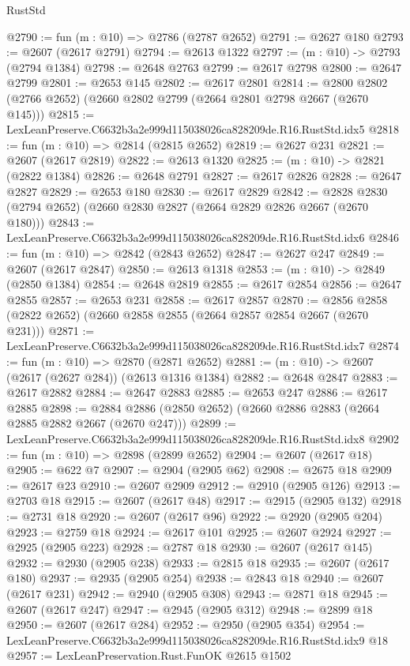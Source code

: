 \begin{lexlean}{RustStd}
\begin{coremodule}
@2790 := fun (m : @10) => @2786 (@2787 @2652)
@2791 := @2627 @180
@2793 := @2607 (@2617 @2791)
@2794 := @2613 @1322
@2797 := (m : @10) -> @2793 (@2794 @1384)
@2798 := @2648 @2763
@2799 := @2617 @2798
@2800 := @2647 @2799
@2801 := @2653 @145
@2802 := @2617 @2801
@2814 := @2800 @2802 (@2766 @2652) (@2660 @2802 @2799 (@2664 @2801 @2798 @2667 (@2670 @145)))
@2815 := LexLeanPreserve.C6632b3a2e999d115038026ca828209de.R16.RustStd.idx5
@2818 := fun (m : @10) => @2814 (@2815 @2652)
@2819 := @2627 @231
@2821 := @2607 (@2617 @2819)
@2822 := @2613 @1320
@2825 := (m : @10) -> @2821 (@2822 @1384)
@2826 := @2648 @2791
@2827 := @2617 @2826
@2828 := @2647 @2827
@2829 := @2653 @180
@2830 := @2617 @2829
@2842 := @2828 @2830 (@2794 @2652) (@2660 @2830 @2827 (@2664 @2829 @2826 @2667 (@2670 @180)))
@2843 := LexLeanPreserve.C6632b3a2e999d115038026ca828209de.R16.RustStd.idx6
@2846 := fun (m : @10) => @2842 (@2843 @2652)
@2847 := @2627 @247
@2849 := @2607 (@2617 @2847)
@2850 := @2613 @1318
@2853 := (m : @10) -> @2849 (@2850 @1384)
@2854 := @2648 @2819
@2855 := @2617 @2854
@2856 := @2647 @2855
@2857 := @2653 @231
@2858 := @2617 @2857
@2870 := @2856 @2858 (@2822 @2652) (@2660 @2858 @2855 (@2664 @2857 @2854 @2667 (@2670 @231)))
@2871 := LexLeanPreserve.C6632b3a2e999d115038026ca828209de.R16.RustStd.idx7
@2874 := fun (m : @10) => @2870 (@2871 @2652)
@2881 := (m : @10) -> @2607 (@2617 (@2627 @284)) (@2613 @1316 @1384)
@2882 := @2648 @2847
@2883 := @2617 @2882
@2884 := @2647 @2883
@2885 := @2653 @247
@2886 := @2617 @2885
@2898 := @2884 @2886 (@2850 @2652) (@2660 @2886 @2883 (@2664 @2885 @2882 @2667 (@2670 @247)))
@2899 := LexLeanPreserve.C6632b3a2e999d115038026ca828209de.R16.RustStd.idx8
@2902 := fun (m : @10) => @2898 (@2899 @2652)
@2904 := @2607 (@2617 @18)
@2905 := @622 @7
@2907 := @2904 (@2905 @62)
@2908 := @2675 @18
@2909 := @2617 @23
@2910 := @2607 @2909
@2912 := @2910 (@2905 @126)
@2913 := @2703 @18
@2915 := @2607 (@2617 @48)
@2917 := @2915 (@2905 @132)
@2918 := @2731 @18
@2920 := @2607 (@2617 @96)
@2922 := @2920 (@2905 @204)
@2923 := @2759 @18
@2924 := @2617 @101
@2925 := @2607 @2924
@2927 := @2925 (@2905 @223)
@2928 := @2787 @18
@2930 := @2607 (@2617 @145)
@2932 := @2930 (@2905 @238)
@2933 := @2815 @18
@2935 := @2607 (@2617 @180)
@2937 := @2935 (@2905 @254)
@2938 := @2843 @18
@2940 := @2607 (@2617 @231)
@2942 := @2940 (@2905 @308)
@2943 := @2871 @18
@2945 := @2607 (@2617 @247)
@2947 := @2945 (@2905 @312)
@2948 := @2899 @18
@2950 := @2607 (@2617 @284)
@2952 := @2950 (@2905 @354)
@2954 := LexLeanPreserve.C6632b3a2e999d115038026ca828209de.R16.RustStd.idx9 @18
@2957 := LexLeanPreservation.Rust.FunOK @2615 @1502

\end{coremodule}
\end{lexlean}
